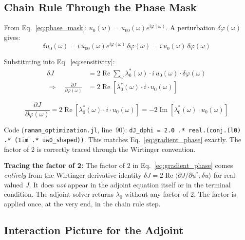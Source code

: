 \documentclass[12pt,a4paper]{article}
\newcommand{\pdv}[2]{\frac{\partial #1}{\partial #2}}
\newcommand{\Real}{\operatorname{Re}}
\newcommand{\Imag}{\operatorname{Im}}
\theoremstyle{definition}
\begin{document}
\subsection{Chain Rule Through the Phase Mask}
\label{sec:chain_rule}

From Eq.~\eqref{eq:phase_mask}: $u_0(\omega) = u_{00}(\omega)e^{i\varphi(\omega)}$. A perturbation $\delta\varphi(\omega)$ gives:
\begin{equation}
\delta u_0(\omega) = i\,u_{00}(\omega)e^{i\varphi(\omega)}\,\delta\varphi(\omega) = i\,u_0(\omega)\,\delta\varphi(\omega)
\end{equation}

Substituting into Eq.~\eqref{eq:sensitivity}:
\begin{align}
\delta J &= 2\Real\sum_\omega \lambda_0^*(\omega)\cdot i\,u_0(\omega)\cdot\delta\varphi(\omega) \nonumber\\
\Rightarrow\quad \pdv{J}{\varphi(\omega)} &= 2\Real\!\left[\lambda_0^*(\omega)\cdot i\cdot u_0(\omega)\right]
\end{align}

\begin{keyresult}
\begin{equation}
\boxed{\pdv{J}{\varphi(\omega)} = 2\Real\!\left[\lambda_0^*(\omega)\cdot i\cdot u_0(\omega)\right] = -2\Imag\!\left[\lambda_0^*(\omega)\cdot u_0(\omega)\right]}
\label{eq:gradient_phase}
\end{equation}
\end{keyresult}

\begin{verified}
Code (\texttt{raman\_optimization.jl}, line~90): \texttt{dJ\_dphi = 2.0 .* real.(conj.(l0) .* (1im .* uw0\_shaped))}. This matches Eq.~\eqref{eq:gradient_phase} exactly. The factor of 2 is correctly traced through the Wirtinger convention.
\end{verified}

\textbf{Tracing the factor of 2:} The factor of 2 in Eq.~\eqref{eq:gradient_phase} comes \emph{entirely} from the Wirtinger derivative identity $\delta J = 2\Real\langle \partial J/\partial u^*, \delta u\rangle$ for real-valued $J$. It does \emph{not} appear in the adjoint equation itself or in the terminal condition. The adjoint solver returns $\lambda_0$ without any factor of 2. The factor is applied once, at the very end, in the chain rule step.

\subsection{Interaction Picture for the Adjoint}
\label{sec:adjoint_ip}
\end{document}
